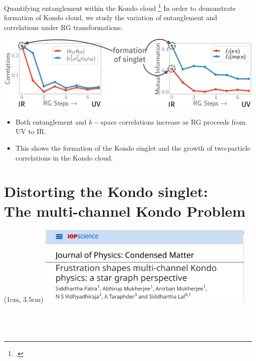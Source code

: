 \documentclass[10pt,aspectratio=169]{beamer}
\begin{document}
\begin{frame}{Quantifying entanglement within the Kondo cloud}
\footcite{anirban_kondo}
In order to demonstrate formation of Kondo cloud, we study the \alert{variation of entanglement} and correlations under RG transformations.

\vspace*{\fill}
\includegraphics[width=\textwidth]{kondoRevRG.pdf}

\vspace*{\fill}
\begin{itemize}
	\item Both entanglement and \(k-\)space correlations \alert{increase} as RG proceeds from UV to IR.\\[10pt]
	\item This shows the formation of the \alert{Kondo singlet} and the growth of two-particle correlations in the \alert{Kondo cloud}.
\end{itemize}
\end{frame}

\section{Distorting the Kondo singlet:\\ The multi-channel Kondo Problem\vspace*{20pt}}
\begin{textblock*}{\textwidth}(1cm, 3.5cm)
\includegraphics[width=0.8\textwidth]{MCKJPCM.pdf}
\end{textblock*}
\subsection{~}
\end{document}
